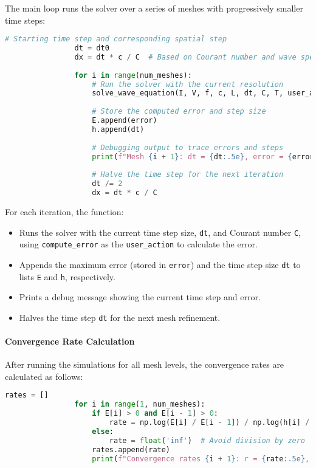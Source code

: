 \documentclass{article}
\begin{document}
			The main loop runs the solver over a series of meshes with progressively smaller time steps:
			
			\begin{lstlisting}[language=Python]
				# Starting time step and corresponding spatial step
				dt = dt0
				dx = dt * c / C  # Based on Courant number and wave speed
				
				for i in range(num_meshes):
					# Run the solver with the current resolution
					solve_wave_equation(I, V, f, c, L, dt, C, T, user_action=compute_error, version=solver_choice)
					
					# Store the computed error and step size
					E.append(error)
					h.append(dt)
					
					# Debugging output to trace errors and steps
					print(f"Mesh {i + 1}: dt = {dt:.5e}, error = {error:.5e}")
					
					# Halve the time step for the next iteration
					dt /= 2
					dx = dt * c / C
			\end{lstlisting}
			
			For each iteration, the function:
			\begin{itemize}
				\item Runs the solver with the current time step size, \texttt{dt}, and Courant number \texttt{C}, using \texttt{compute\_error} as the \texttt{user\_action} to calculate the error.
				\item Appends the maximum error (stored in \texttt{error}) and the time step size \texttt{dt} to lists \texttt{E} and \texttt{h}, respectively.
				\item Prints a debug message showing the current time step and error.
				\item Halves the time step \texttt{dt} for the next mesh refinement.
			\end{itemize}
			
			\paragraph{Convergence Rate Calculation}
			
			After running the simulations for all mesh levels, the convergence rates are calculated as follows:
			
			\begin{lstlisting}[language=Python]
				rates = []
				for i in range(1, num_meshes):
					if E[i] > 0 and E[i - 1] > 0:
						rate = np.log(E[i] / E[i - 1]) / np.log(h[i] / h[i - 1])
					else:
						rate = float('inf')  # Avoid division by zero
					rates.append(rate)
					print(f"Convergence rates {i + 1}: r = {rate:.5e}, error = {E[i]:.5e}")
			\end{lstlisting}
			
\end{document}
